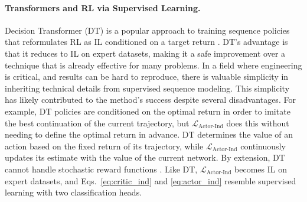 \documentclass{article}
\begin{document}
\paragraph{Transformers and RL via Supervised Learning.} Decision Transformer (DT) is a popular approach to training sequence policies that reformulates RL as IL conditioned on a target return \cite{chen2021decision, janner2021reinforcement, lee2022multi}. DT's advantage is that it reduces to IL on expert datasets, making it a safe improvement over a technique that is already effective for many problems. In a field where engineering is critical, and results can be hard to reproduce, there is valuable simplicity in inheriting technical details from supervised sequence modeling. This simplicity has likely contributed to the method's success despite several disadvantages. For example, DT policies are conditioned on the optimal return in order to imitate the best continuation of the current trajectory, but $\mathcal{L}_{\text{Actor-Ind}}$ does this without needing to define the optimal return in advance. DT determines the value of an action based on the fixed return of its trajectory, while $\mathcal{L}_{\text{Actor-Ind}}$ continuously updates its estimate with the value of the current network. By extension, DT cannot handle stochastic reward functions \cite{paster2022you}. Like DT, $\mathcal{L}_{\text{Actor-Ind}}$ becomes IL on expert datasets, and Eqs.~\eqref{eq:critic_ind} and \eqref{eq:actor_ind} resemble supervised learning with two classification heads.
\end{document}

